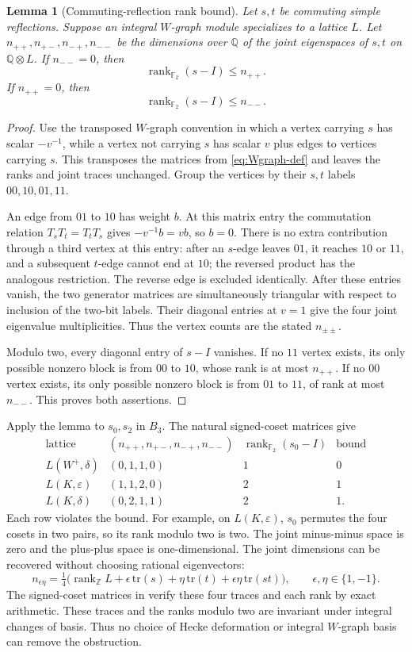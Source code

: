 \documentclass[11pt]{article}
\numberwithin{equation}{section}
\newtheorem{lemma}[theorem]{Lemma}
\theoremstyle{definition}
\DeclareMathOperator{\rank}{rank}
\newcommand{\Z}{\mathbb Z}
\newcommand{\Q}{\mathbb Q}
\newcommand{\F}{\mathbb F}
\newcommand{\ee}{\varepsilon}
\newcommand{\dd}{\delta}
\newcommand{\tr}{\mathrm{tr}}
\begin{document}
\begin{lemma}[Commuting-reflection rank bound]\label{lem:rankobstruction}
Let \(s,t\) be commuting simple reflections.
Suppose an integral \(W\)-graph module specializes to a lattice \(L\).
Let \(n_{++},n_{+-},n_{-+},n_{--}\) be the dimensions over \(\Q\) of the joint eigenspaces of \(s,t\) on \(\Q\otimes L\).
If \(n_{--}=0\), then
\[
 \rank_{\F_2}(s-I)\leq n_{++}.
\]
If \(n_{++}=0\), then
\[
 \rank_{\F_2}(s-I)\leq n_{--}.
\]
\end{lemma}
\begin{proof}
Use the transposed \(W\)-graph convention in which a vertex carrying \(s\) has scalar \(-v^{-1}\), while a vertex not carrying \(s\) has scalar \(v\) plus edges to vertices carrying \(s\).
This transposes the matrices from \eqref{eq:Wgraph-def} and leaves the ranks and joint traces unchanged.
Group the vertices by their \(s,t\) labels \(00,10,01,11\).

An edge from \(01\) to \(10\) has weight \(b\).
At this matrix entry the commutation relation \(T_sT_t=T_tT_s\) gives
\(-v^{-1}b=vb\), so \(b=0\).
There is no extra contribution through a third vertex at this entry: after an \(s\)-edge leaves \(01\), it reaches \(10\) or \(11\), and a subsequent \(t\)-edge cannot end at \(10\); the reversed product has the analogous restriction.
The reverse edge is excluded identically.
After these entries vanish, the two generator matrices are simultaneously triangular with respect to inclusion of the two-bit labels.
Their diagonal entries at \(v=1\) give the four joint eigenvalue multiplicities.
Thus the vertex counts are the stated \(n_{\pm\pm}\).

Modulo two, every diagonal entry of \(s-I\) vanishes.
If no \(11\) vertex exists, its only possible nonzero block is from \(00\) to \(10\), whose rank is at most \(n_{++}\).
If no \(00\) vertex exists, its only possible nonzero block is from \(01\) to \(11\), of rank at most \(n_{--}\).
This proves both assertions.
\end{proof}

Apply the lemma to \(s_0,s_2\) in \(B_3\).
The natural signed-coset matrices give
\[
\begin{array}{c|c|c|c}
\text{lattice}&(n_{++},n_{+-},n_{-+},n_{--})&
 \rank_{\F_2}(s_0-I)&\text{bound}\\ \hline
L(W^+,\dd)&(0,1,1,0)&1&0\\
L(K,\ee)&(1,1,2,0)&2&1\\
L(K,\dd)&(0,2,1,1)&2&1 .
\end{array}
\]
Each row violates the bound.
For example, on \(L(K,\ee)\), \(s_0\) permutes the four cosets in two pairs, so its rank modulo two is two.
The joint minus-minus space is zero and the plus-plus space is one-dimensional.
The joint dimensions can be recovered without choosing rational eigenvectors:
\[
 n_{\epsilon\eta}=\tfrac14\bigl(\rank_\Z L+
 \epsilon\,\tr(s)+\eta\,\tr(t)+\epsilon\eta\,\tr(st)\bigr),
 \qquad\epsilon,\eta\in\{1,-1\}.
\]
The signed-coset matrices in \cite{ZhangData} verify these four traces and each rank by exact arithmetic.
These traces and the ranks modulo two are invariant under integral changes of basis.
Thus no choice of Hecke deformation or integral \(W\)-graph basis can remove the obstruction.
\end{document}

